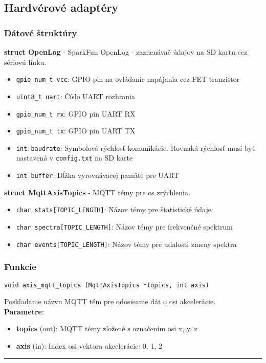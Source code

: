 \subsection{Hardvérové adaptéry} \label{modules:hardware}

\subsubsection*{Dátové štruktúry}
\textbf{struct OpenLog} - SparkFun OpenLog - zaznenávač údajov na SD kartu cez sériovú linku.
\begin{itemize}[noitemsep, topsep=0pt]
	\item \verb|gpio_num_t vcc|: GPIO pin na ovládanie napájania cez FET tranzistor
	\item \verb|uint8_t uart|: Číslo UART rozhrania
	\item \verb|gpio_num_t rx|: GPIO pin UART RX
	\item \verb|gpio_num_t tx|: GPIO pin UART TX
	\item \verb|int baudrate|: Symbolová rýchlosť komunikácie. Rovnaká rýchlosť musí byť nastavená v \verb|config.txt| na SD karte
	\item \verb|int buffer|: Dĺžka vyrovnávacej pamäte pre UART
\end{itemize}
\bigbreak

\noindent\textbf{struct MqttAxisTopics} - MQTT témy pre os zrýchlenia.
\begin{itemize}[noitemsep, topsep=0pt]
	\item \verb|char stats[TOPIC_LENGTH]|: Názov témy pre štatistické údaje
	\item \verb|char spectra[TOPIC_LENGTH]|: Názov témy pre frekvenčné spektrum
	\item \verb|char events[TOPIC_LENGTH]|: Názov témy pre udalosti zmeny spektra
\end{itemize}


\subsubsection*{Funkcie}
\begin{lstlisting}[style=docs]
void axis_mqtt_topics (MqttAxisTopics *topics, int axis)
\end{lstlisting}
   Poskladanie názvu MQTT tém pre odosieanie dát o osi akcelerácie. \\
\textbf{Parametre}:
\begin{itemize}[noitemsep, topsep=0pt]
	\item \textbf{topics} (out): MQTT témy zložené s označením osi x, y, z
	\item \textbf{axis} (in): Index osi vektora akcelerácie: 0, 1, 2 
\end{itemize}
\bigbreak
\hrule

